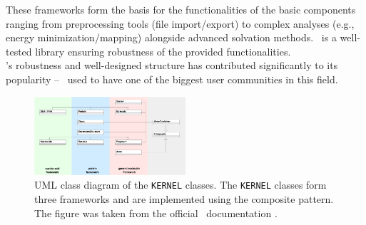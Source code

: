 These frameworks form the basis for the functionalities of the basic components ranging from preprocessing tools (file import/export) to complex analyses (e.g., energy minimization/mapping) alongside advanced solvation methods. 
\ball\ is a well-tested library ensuring robustness of the provided functionalities. \\

\ball's robustness and well-designed structure has contributed significantly to its popularity -- \ball\ used to have one of the biggest user communities in this field.


\begin{figure}[t]
	\centerline{\includegraphics[width=0.5\textwidth]{gfx/KERNEL.png}}
	\caption{UML class diagram of the \texttt{KERNEL} classes. The \texttt{KERNEL} classes form three frameworks and are implemented using the composite pattern\cite{gamma1994design}. The figure was taken from the official \ball\ documentation \cite{BALLTutorial}.}
	\label{fig:ball_structure}
\end{figure}

